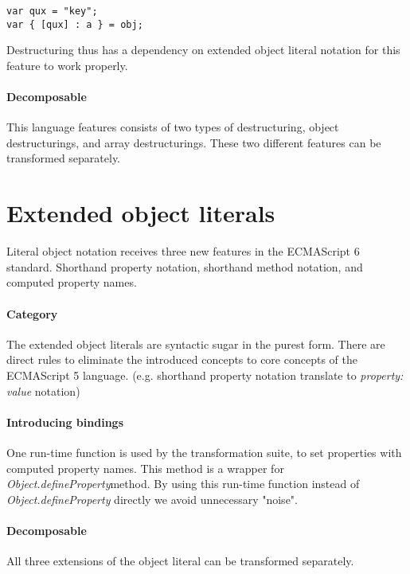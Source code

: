 \begin{lstlisting}
var qux = "key";
var { [qux] : a } = obj;
\end{lstlisting}

Destructuring thus has a dependency on extended object literal notation for this feature to work properly.

\paragraph{Decomposable}
This language features consists of two types of destructuring, object destructurings, and array destructurings. These two different features can be transformed separately. 

\section{Extended object literals} \label{object-literals}
Literal object notation receives three new features in the ECMAScript 6 standard\cite[12.2.5]{SpecJS}. Shorthand property notation, shorthand method notation, and computed property names.

\paragraph{Category}
The extended object literals are syntactic sugar in the purest form. There are direct rules to eliminate the introduced concepts to core concepts of the ECMAScript 5 language. (e.g. shorthand property notation translate to \textit{property: value} notation)

\paragraph{Introducing bindings}
One run-time function is used by the transformation suite, to set properties with computed property names. This method is a wrapper for \textit{Object.defineProperty}\footnotemark method. By using this run-time function instead of \textit{Object.defineProperty} directly we avoid unnecessary "noise".

\paragraph{Decomposable}
All three extensions of the object literal can be transformed separately. 

